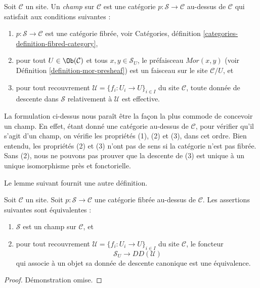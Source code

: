 \begin{definition}
\label{definition-stack}
Soit $\mathcal{C}$ un site. Un {\it champ} sur $\mathcal{C}$
est une catégorie $p : \mathcal{S} \to \mathcal{C}$ au-dessus de $\mathcal{C}$ qui
satisfait aux conditions suivantes :
\begin{enumerate}
\item $p : \mathcal{S} \to \mathcal{C}$ est une catégorie fibrée, voir
Catégories, définition \ref{categories-definition-fibred-category},
\item pour tout $U \in \Ob(\mathcal{C})$ et tous $x, y \in \mathcal{S}_U$,
le préfaisceau $\mathit{Mor}(x, y)$ (voir
Définition \ref{definition-mor-presheaf}) est un faisceau sur
le site $\mathcal{C}/U$, et
\item pour tout recouvrement $\mathcal{U} = \{f_i : U_i \to U\}_{i \in I}$
du site $\mathcal{C}$, toute donnée de descente dans $\mathcal{S}$
relativement à $\mathcal{U}$ est effective.
\end{enumerate}
\end{definition}

\noindent
La formulation ci-dessus nous paraît être la façon la plus commode de concevoir
un champ. En effet, étant donné une catégorie au-dessus de $\mathcal{C}$, pour vérifier
qu'il s'agit d'un champ, on vérifie les propriétés (1), (2) et
(3), dans cet ordre. Bien entendu, les propriétés (2) et (3) n'ont pas de sens
si la catégorie n'est pas fibrée. Sans (2), nous ne pouvons pas prouver que la
descente de (3) est unique à un unique isomorphisme près et fonctorielle.

\medskip\noindent
Le lemme suivant fournit une autre définition.

\begin{lemma}
\label{lemma-stack-equivalences}
Soit $\mathcal{C}$ un site.
Soit $p : \mathcal{S} \to \mathcal{C}$ une catégorie fibrée
au-dessus de $\mathcal{C}$. Les assertions suivantes sont équivalentes :
\begin{enumerate}
\item $\mathcal{S}$ est un champ sur $\mathcal{C}$, et
\item pour tout recouvrement $\mathcal{U} = \{f_i : U_i \to U\}_{i \in I}$
du site $\mathcal{C}$, le foncteur
$$
\mathcal{S}_U \longrightarrow DD(\mathcal{U})
$$
qui associe à un objet sa donnée de descente canonique est une équivalence.
\end{enumerate}
\end{lemma}

\begin{proof}
Démonstration omise.
\end{proof}

